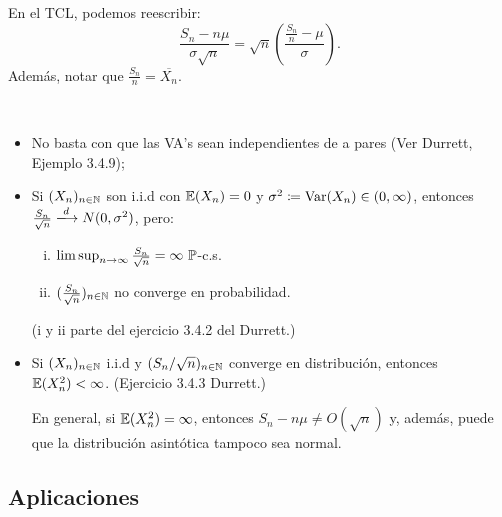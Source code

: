 
\begin{note}
	En el TCL, podemos reescribir:
	\[ \frac{S_{n} - n\mu}{\sigma \sqrt{n}} = \sqrt{n} \left( \frac{\frac{S_{n}}{n} - \mu}{\sigma} \right). \]
	Además, notar que $\frac{S_{n}}{n} = \overline{X_{n}}$.
\end{note}

\begin{note}~
	\begin{itemize}
		\item No basta con que las VA's sean independientes de a pares (Ver Durrett, Ejemplo 3.4.9);

		\item Si $(X_{n})_{n \in \mathbb{N}}$ son i.i.d con $\mathbb{E}(X_{n}) = 0$ y $\sigma^{2} \coloneq \operatorname{Var}(X_{n}) \in (0, \infty)$, entonces $\frac{S_{n}}{\sqrt{n}} \xlongrightarrow{d} N(0, \sigma^{2})$, pero:
		\begin{enumerate}[i)]
			\item $\limsup_{n \to \infty} \frac{S_{n}}{\sqrt{n}} = \infty \ \mathbb{P}$-c.s.

			\item $(\frac{S_{n}}{\sqrt{n}})_{n \in \mathbb{N}}$ no converge en probabilidad.
		\end{enumerate}
		(i y ii parte del ejercicio 3.4.2 del Durrett.)

		\item Si $(X_{n})_{n \in \mathbb{N}}$ i.i.d y $(S_{n} \slash \sqrt{n})_{n \in \mathbb{N}}$ converge en distribución, entonces $\mathbb{E}(X_{n}^{2}) < \infty$. (Ejercicio 3.4.3 Durrett.) \par 
		En general, si $\mathbb{E}(X_{n}^{2}) = \infty$, entonces $S_{n} - n\mu \neq O(\sqrt{n})$ y, además, puede que la distribución asintótica tampoco sea normal.
	\end{itemize}
\end{note}

\subsection{Aplicaciones}

